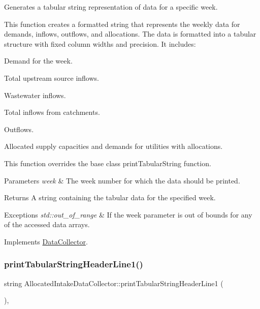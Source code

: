 Generates a tabular string representation of data for a specific week. 

This function creates a formatted string that represents the weekly data for demands, inflows, outflows, and allocations. The data is formatted into a tabular structure with fixed column widths and precision. It includes\+:
\begin{DoxyItemize}
\item Demand for the week.
\item Total upstream source inflows.
\item Wastewater inflows.
\item Total inflows from catchments.
\item Outflows.
\item Allocated supply capacities and demands for utilities with allocations.
\end{DoxyItemize}

This function overrides the base class {\ttfamily print\+Tabular\+String} function.


\begin{DoxyParams}{Parameters}
{\em week} & The week number for which the data should be printed. \\
\hline
\end{DoxyParams}
\begin{DoxyReturn}{Returns}
A string containing the tabular data for the specified week.
\end{DoxyReturn}

\begin{DoxyExceptions}{Exceptions}
{\em std\+::out\+\_\+of\+\_\+range} & If the {\ttfamily week} parameter is out of bounds for any of the accessed data arrays. \\
\hline
\end{DoxyExceptions}


Implements \mbox{\hyperlink{classDataCollector_a397fccabe0223267eea8fc7cac0e59da}{Data\+Collector}}.

\mbox{\label{classAllocatedIntakeDataCollector_ab4149a988e728ce54f89058f8f18dd18}} 
\subsubsection{\texorpdfstring{print\+Tabular\+String\+Header\+Line1()}{printTabularStringHeaderLine1()}}
{\footnotesize\ttfamily string Allocated\+Intake\+Data\+Collector\+::print\+Tabular\+String\+Header\+Line1 (\begin{DoxyParamCaption}{ }\end{DoxyParamCaption})\hspace{0.3cm}{\ttfamily [override]}, {\ttfamily [virtual]}}



